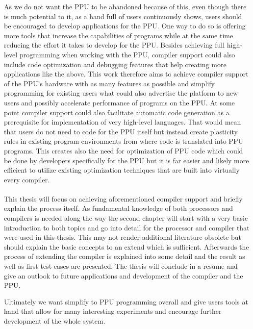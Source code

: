 As we do not want the PPU to be abandoned because of this, even though there is much potential to it, as a hand full of users continuously shows, users should be encouraged to develop applications for the PPU.
One way to do so is offering more tools that increase the capabilities of programs while at the same time reducing the effort it takes to develop for the PPU.
Besides achieving full high-level programming when working with the PPU, compiler support could also include code optimization and debugging features that help creating more applications like the above.
This work therefore aims to achieve compiler support of the PPU's hardware with as many features as possible and simplify programming for existing users what could also advertise the platform to new users and possibly accelerate performance of programs on the PPU.
At some point compiler support could also facilitate automatic code generation as a prerequisite for implementation of very high-level languages.
That would mean that users do not need to code for the PPU itself but instead create plasticity rules in existing program environments from where code is translated into PPU programs.
This creates also the need for optimization of PPU code which could be done by developers specifically for the PPU but it is far easier and likely more efficient to utilize existing optimization techniques that are built into virtually every compiler.
\\
\\
This thesis will focus on achieving aforementioned compiler support and briefly explain the process itself.
As fundamental knowledge of both processors and compilers is needed along the way the second chapter will start with a very basic introduction to both topics and go into detail for the processor and compiler that were used in this thesis.
This may not render additional literature obsolete but should explain the basic concepts to an extend which is sufficient.
Afterwards the process of extending the compiler is explained into some detail and the result as well as first test cases are presented.
The thesis will conclude in a resume and give an outlook to future applications and development of the compiler and the PPU.

Ultimately we want simplify to PPU programming overall and give users tools at hand that allow for many interesting experiments and encourage further development of the whole system.





